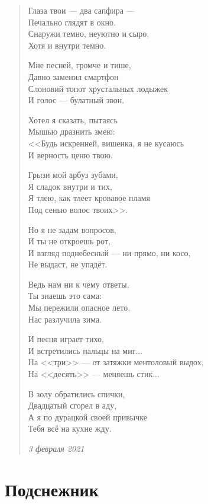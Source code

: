 \begin{verse}
Глаза твои --- два сапфира --- \\
Печально глядят в окно. \\
Снаружи темно, неуютно и сыро, \\
Хотя и внутри темно.

Мне песней, громче и тише, \\
Давно заменил смартфон \\
Слоновий топот хрустальных лодыжек \\
И голос --- булатный звон.

Хотел я сказать, пытаясь \\
Мышью дразнить змею: \\
<<Будь искренней, вишенка, я не кусаюсь \\
И верность ценю твою.

Грызи мой арбуз зубами, \\
Я сладок внутри и тих, \\
Я тлею, как тлеет кровавое пламя \\
Под сенью волос твоих>>.

Но я не задам вопросов, \\
И ты не откроешь рот, \\
И взгляд поднебесный --- ни прямо, ни косо, \\
Не выдаст, не упадёт.

Ведь нам ни к чему ответы, \\
Ты знаешь это сама: \\
Мы пережили опасное лето, \\
Нас разлучила зима.

И песня играет тихо, \\
И встретились пальцы на миг... \\
На <<три>> --- от затяжки ментоловый выдох, \\
На <<десять>> --- меняешь стик...

В золу обратились спички, \\
Двадцатый сгорел в аду, \\
А я по дурацкой своей привычке \\
Тебя всё на кухне жду.

\emph{3 февраля 2021}
\end{verse}

\newpage
\section{Подснежник}

